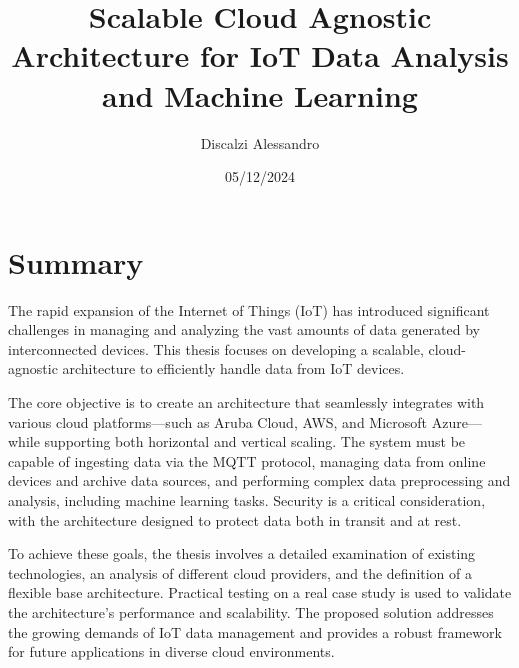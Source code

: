 \documentclass[12pt,a4paper,twoside,openright]{extreport}
\title{Scalable Cloud Agnostic Architecture for IoT Data Analysis and Machine Learning}
\author{Discalzi Alessandro}
\date{05/12/2024}
\begin{document}
    \pagestyle{empty} %

    
    \cleardoublepage
    
    
    \cleardoublepage

    \pagestyle{plain} %

    \chapter*{Summary}
    The rapid expansion of the Internet of Things (IoT) has introduced significant challenges in managing and analyzing the vast amounts of data generated by interconnected devices. This thesis focuses on developing a scalable, cloud-agnostic architecture to efficiently handle data from IoT devices.

The core objective is to create an architecture that seamlessly integrates with various cloud platforms—such as Aruba Cloud, AWS, and Microsoft Azure—while supporting both horizontal and vertical scaling. The system must be capable of ingesting data via the MQTT protocol, managing data from online devices and archive data sources, and performing complex data preprocessing and analysis, including machine learning tasks. Security is a critical consideration, with the architecture designed to protect data both in transit and at rest.

To achieve these goals, the thesis involves a detailed examination of existing technologies, an analysis of different cloud providers, and the definition of a flexible base architecture. Practical testing on a real case study is used to validate the architecture’s performance and scalability. The proposed solution addresses the growing demands of IoT data management and provides a robust framework for future applications in diverse cloud environments.

    \cleardoublepage

    \tableofcontents
    \cleardoublepage
    
    \listoffigures
    \listoftables
    \cleardoublepage
    

    
    \cleardoublepage
    
    \cleardoublepage
    
    \cleardoublepage
    
    \cleardoublepage
    
    \cleardoublepage
    
    \cleardoublepage
    
    \cleardoublepage
    
    \cleardoublepage

    \printbibliography[heading=bibintoc]
\end{document}

